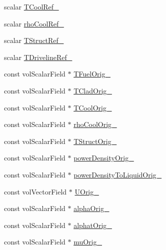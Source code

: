 \begin{DoxyCompactItemize}
\item 
scalar \hyperlink{classFoam_1_1pointKineticNeutronics_ac3372b0ed28d321ccedf66628393b4ad}{T\+Cool\+Ref\+\_\+}
\item 
scalar \hyperlink{classFoam_1_1pointKineticNeutronics_af7db5962fe92b6af73ffe43f583a75ab}{rho\+Cool\+Ref\+\_\+}
\item 
scalar \hyperlink{classFoam_1_1pointKineticNeutronics_a74c27d1f6f39caa165db9b9f81dffcfb}{T\+Struct\+Ref\+\_\+}
\item 
scalar \hyperlink{classFoam_1_1pointKineticNeutronics_ab1b032ce2a0051f2e5cd2197735963ba}{T\+Driveline\+Ref\+\_\+}
\item 
const vol\+Scalar\+Field $\ast$ \hyperlink{classFoam_1_1pointKineticNeutronics_a871434fb035f6837b1b236a1ec520abc}{T\+Fuel\+Orig\+\_\+}
\item 
const vol\+Scalar\+Field $\ast$ \hyperlink{classFoam_1_1pointKineticNeutronics_a9abfa8412a2bd9f5eab3df63b82e6272}{T\+Clad\+Orig\+\_\+}
\item 
const vol\+Scalar\+Field $\ast$ \hyperlink{classFoam_1_1pointKineticNeutronics_a5997986d4c1a95752dfbf17e4d533cbc}{T\+Cool\+Orig\+\_\+}
\item 
const vol\+Scalar\+Field $\ast$ \hyperlink{classFoam_1_1pointKineticNeutronics_a1da8adeb20ff6742068c9befe8b16f25}{rho\+Cool\+Orig\+\_\+}
\item 
const vol\+Scalar\+Field $\ast$ \hyperlink{classFoam_1_1pointKineticNeutronics_abbefccb2078842b86f95dccaa27cc5fb}{T\+Struct\+Orig\+\_\+}
\item 
const vol\+Scalar\+Field $\ast$ \hyperlink{classFoam_1_1pointKineticNeutronics_a23f8a8cd25603cf78f5f402fd280d001}{power\+Density\+Orig\+\_\+}
\item 
const vol\+Scalar\+Field $\ast$ \hyperlink{classFoam_1_1pointKineticNeutronics_a9b77e265604bf6b6a5cab596d74ec422}{power\+Density\+To\+Liquid\+Orig\+\_\+}
\item 
const vol\+Vector\+Field $\ast$ \hyperlink{classFoam_1_1pointKineticNeutronics_a92f1255350afa632167f9df0b8cd0d54}{U\+Orig\+\_\+}
\item 
const vol\+Scalar\+Field $\ast$ \hyperlink{classFoam_1_1pointKineticNeutronics_a274c5fa5568001183ce2f40523b458f3}{alpha\+Orig\+\_\+}
\item 
const vol\+Scalar\+Field $\ast$ \hyperlink{classFoam_1_1pointKineticNeutronics_a0b2a30a35ad577545e222153fd84d363}{alphat\+Orig\+\_\+}
\item 
const vol\+Scalar\+Field $\ast$ \hyperlink{classFoam_1_1pointKineticNeutronics_a7fa28815680aa43e2c72f58a8eee9e43}{mu\+Orig\+\_\+}

\end{DoxyCompactItemize}
